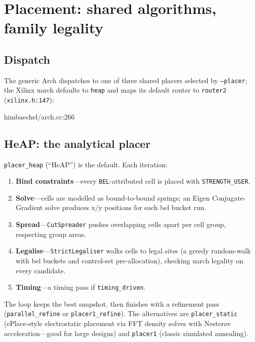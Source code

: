 \documentclass[11pt,a4paper]{article}
\begin{document}
\section{Placement: shared algorithms, family legality}

\subsection{Dispatch}

The generic Arch dispatches to one of three shared placers selected by
\texttt{--placer}; the Xilinx uarch defaults to \texttt{heap} and maps
its default router to \texttt{router2} (\texttt{xilinx.h:147}):

\begin{cppfile}{himbaechel/arch.cc:266}
  
\end{cppfile}

\subsection{HeAP: the analytical placer}

\texttt{placer\_heap} (``HeAP'') is the default. Each iteration:

\begin{enumerate}
\item \textbf{Bind constraints}---every \texttt{BEL}-attributed cell is
  placed with \texttt{STRENGTH\_USER}.
\item \textbf{Solve}---cells are modelled as bound-to-bound springs; an
  Eigen Conjugate-Gradient solve produces x/y positions for each bel
  bucket run.
\item \textbf{Spread}---\texttt{CutSpreader} pushes overlapping cells
  apart per cell group, respecting group areas.
\item \textbf{Legalise}---\texttt{StrictLegaliser} walks cells to legal
  sites (a greedy random-walk with bel buckets and control-set
  pre-allocation), checking uarch legality on every candidate.
\item \textbf{Timing}---a timing pass if \texttt{timing\_driven}.
\end{enumerate}

The loop keeps the best snapshot, then finishes with a refinement pass
(\texttt{parallel\_refine} or \texttt{placer1\_refine}). The
alternatives are \texttt{placer\_static} (ePlace-style electrostatic
placement via FFT density solves with Nesterov acceleration---good for
large designs) and \texttt{placer1} (classic simulated annealing).
\end{document}
